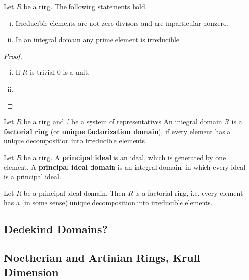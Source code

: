 	\begin{lemma}
		Let $R$ be a ring. The following statements hold.
		\begin{enumerate}[(i)]
			\item{
				Irreducible elements are not zero divisors and are inparticular nonzero.
			}
			\item{
				In an integral domain any prime element is irreducible
			}
		\end{enumerate}
	\end{lemma}
	\begin{proof}
		\begin{enumerate}[(i)]
			\item{
				If $R$ is trivial $0$ is a unit.
			}
			\item{

			}
		\end{enumerate}
	\end{proof}

	\begin{definition}
		Let $R$ be a ring and $I$ be a system of representatives
		An integral domain $R$ is a \textbf{factorial ring} (or \textbf{unique factorization domain}), if every element has a unique decomposition into irreducible elements
	\end{definition}

	\begin{definition}
		Let $R$ be a ring. A \textbf{principal ideal} is an ideal, which is generated by one element. A \textbf{principal ideal domain} is an integral domain, in which every ideal is a principal ideal.
	\end{definition}

	\begin{theorem}
		Let $R$ be a principal ideal domain. Then $R$ is a factorial ring, i.e. every element has a (in some sense) unique decomposition into irreducible elements.
	\end{theorem}

	\subsection{Dedekind Domains?}

	\newpage
	\subsection{Noetherian and Artinian Rings, Krull Dimension}

